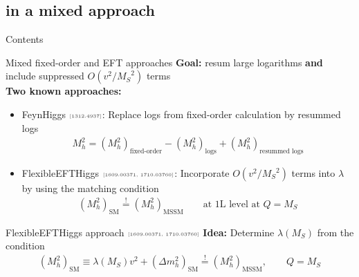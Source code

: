 \documentclass[hyperref={pdfpagelabels=false},ngerman]{beamer}
\newcommand{\MS}{\ensuremath{M_S}}
\newcommand{\mycite}[1]{\ensuremath{\text{\textcolor{darkgray}{\tiny [#1]}}}}
\renewcommand{\emph}{\textbf}
\newcommand{\SM}{\ensuremath{\text{SM}}}
\newcommand{\MSSM}{\ensuremath{\text{MSSM}}}
\begin{document}

\subsection{in a mixed approach}

\begin{frame}{Contents}
  \tableofcontents[
  currentsection,
  currentsubsection,
  subsectionstyle=show/shaded/hide]  
\end{frame}

\begin{frame}{Mixed fixed-order and EFT approaches}
  \emph{Goal:} resum large logarithms \emph{and} include suppressed
  $O(v^2/\MS^2)$ terms
  \\[2em]
  \emph{Two known approaches:}
  \begin{itemize}
  \item FeynHiggs \mycite{1312.4937}: Replace logs from
    fixed-order calculation by resummed logs
    \begin{align*}
      M_h^2 = (M_h^2)_{\text{fixed-order}} - (M_h^2)_{\text{logs}} + (M_h^2)_{\text{resummed logs}}
    \end{align*}
  \item FlexibleEFTHiggs \mycite{1609.00371, 1710.03760}: Incorporate
    $O(v^2/\MS^2)$ terms into $\lambda$ by using the matching
    condition
    \begin{align*}
      (M_h^2)_{\SM} \overset{!}{=} (M_h^2)_{\MSSM} \qquad \text{at 1L level at } Q = \MS
    \end{align*}
  \end{itemize}
\end{frame}

\begin{frame}{FlexibleEFTHiggs approach \mycite{1609.00371, 1710.03760}}
  \emph{Idea:}
  Determine $\lambda(\MS)$ from the condition
  \begin{align*}
    (M_h^2)_{\SM} \equiv \lambda(\MS) v^2 + (\Delta m_h^2)_{\SM} \overset{!}{=} (M_h^2)_{\MSSM} , \qquad Q = \MS
  \end{align*}
  \begin{center}
  \end{center}
\end{frame}
\end{document}
